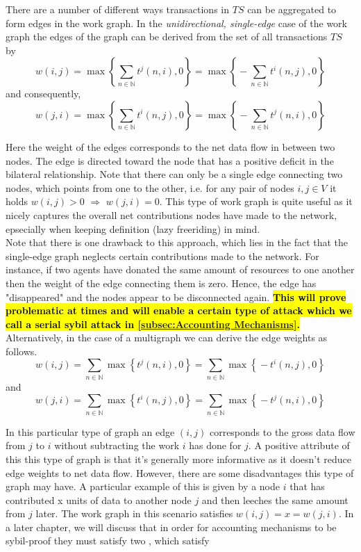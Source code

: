 \noindent{}There are a number of different ways transactions in $TS$ can be aggregated to form edges in the work graph. In the {\it unidirectional, single-edge} case of the work graph the edges of the graph can be derived from the set of all transactions $TS$ by
\[
w(i,j) = \max\left\lbrace{}\sum\limits_{n\in\mathbb{N}}t^j(n,i), 0\right\rbrace = \max\left\lbrace{}-\sum\limits_{n\in\mathbb{N}}t^i(n,j), 0\right\rbrace
\]
and consequently, 
\[
w(j,i) = \max\left\lbrace{}\sum\limits_{n\in\mathbb{N}}t^i(n,j), 0\right\rbrace = \max\left\lbrace{}-\sum\limits_{n\in\mathbb{N}}t^j(n,i), 0\right\rbrace
\]

\noindent{}Here the weight of the edges corresponds to the net data flow in between two nodes. The edge is directed toward the node that has a positive deficit in the bilateral relationship. Note that there can only be a single edge connecting two nodes, which points from one to the other, i.e. for any pair of nodes $i,j\in{}V$ it holds $w(i,j)>0\,\,\Rightarrow\,\,w(j,i)=0$. This type of work graph is quite useful as it nicely captures the overall net contributions nodes have made to the network, epsecially when keeping definition (lazy freeriding) in mind. \vspace{1em}\\

\noindent{}Note that there is one drawback to this approach, which lies in the fact that the single-edge graph neglects certain contributions made to the network. For instance, if two agents have donated the same amount of resources to one another then the weight of the edge connecting them is zero. Hence, the edge has "disappeared" and the nodes appear to be disconnected again. \textcolor{red}{\textbf{\hl{This will prove problematic at times and will enable a certain type of attack which we call a serial sybil attack in \ref{subsec:Accounting Mechanisms}.}}}\vspace{1em}\\

\noindent{}Alternatively, in the case of a multigraph we can derive the edge weights as follows.
\[
w(i,j) = \sum\limits_{n\in\mathbb{N}}\max\left\lbrace{}t^j(n,i), 0 \right\rbrace = \sum\limits_{n\in\mathbb{N}}\max\left\lbrace{}-t^i(n,j),0\right\rbrace 
\]
\noindent{}and
\[
w(j,i) = \sum\limits_{n\in\mathbb{N}}\max\left\lbrace{}t^i(n,j), 0 \right\rbrace = \sum\limits_{n\in\mathbb{N}}\max\left\lbrace{}-t^j(n,i),0\right\rbrace
\]

\noindent{}In this particular type of graph an edge $(i,j)$ corresponds to the gross data flow from $j$ to $i$ without subtracting the work $i$ has done for $j$. A positive attribute of this this type of graph is that it's generally more informative as it doesn't reduce edge weights to net data flow. However, there are some disadvantages this type of graph may have. A particular example of this is given by a node $i$ that has contributed x units of data to another node $j$ and then leeches the same amount from $j$ later. The work graph in this scenario satisfies $w(i,j)=x=w(j,i)$. In a later chapter, we will discuss that in order for accounting mechanisms to be sybil-proof they must satisfy two , which satisfy \vspace{1em}\\ 


